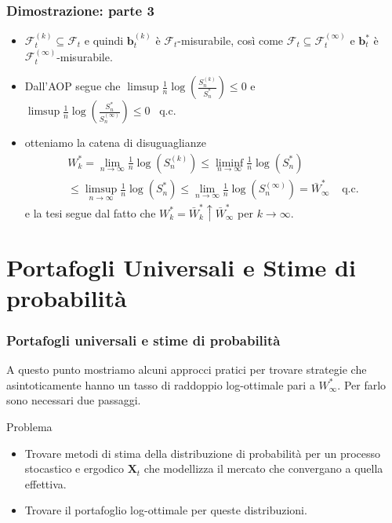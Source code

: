 \documentclass{beamer}
\theoremstyle{plain}
\theoremstyle{definition}
\theoremstyle{remark}
\newcommand{\X}{\bm{X}}
\newcommand{\B}{\bm{b}}
\newcommand{\F}{\mathcal{F}}
\begin{document}
\begin{frame}
	\frametitle{Dimostrazione: parte 3}
	\begin{itemize}
		\item 	$\F_t^{(k)}\subseteq \F_t$ e quindi $\B_t^{(k)}$ è $\F_t$-misurabile, così come $\F_t\subseteq \F_t^{(\infty)}$ e $\B_t^*$ è $\F_t^{(\infty)}$-misurabile.
		\item Dall'AOP segue che $\limsup\frac{1}{n}\log\left(\frac{S_n^{(k)}}{S_n^*}\right)\leq 0$ e $ \limsup\frac{1}{n}\log\left(\frac{S_n^*}{S_n^{(\infty)}}\right)\leq 0 \;\;\; \text{q.c.}$
		\item otteniamo la catena di disuguaglianze
		\begin{align*}
		W_k^*=\lim\limits_{n\to\infty}\frac{1}{n}\log(S_n^{(k)})  \leq \liminf\limits_{n\to\infty}\frac{1}{n}\log(S_n^*)\\
	 	\leq \limsup\limits_{n\to\infty}\frac{1}{n}\log(S_n^*)\leq \lim\limits_{n\to \infty}\frac{1}{n}\log(S_n^{(\infty)})=\bar{W}^*_\infty\;\;\;\; \text{q.c.}
		\end{align*}
		e la tesi segue dal fatto che $W^*_k = \bar{W}_k^*\uparrow \bar{W}_\infty^*$ per $k \to \infty$. 
	\end{itemize}
\end{frame}

\section{Portafogli Universali e Stime di probabilità}
\begin{frame}[label=postAEP]
\frametitle{Portafogli universali e stime di probabilità}
A questo punto mostriamo alcuni approcci pratici per trovare strategie che asintoticamente hanno un tasso di raddoppio log-ottimale pari a $W^*_\infty$. Per farlo sono necessari due passaggi.
\begin{block}{Problema}
	\begin{itemize}
		\item Trovare metodi di stima della distribuzione di probabilità per un processo stocastico e ergodico $\X_t$ che modellizza il mercato che convergano a quella effettiva.
		\item Trovare il portafoglio log-ottimale per queste distribuzioni.
	\end{itemize}
\end{block}
\end{frame}
\end{document}
